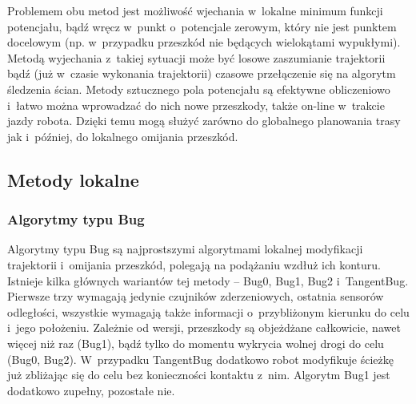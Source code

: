 Problemem obu metod jest możliwość
wjechania w~lokalne minimum funkcji potencjału, bądź wręcz w~punkt o~potencjale zerowym,
który nie jest punktem docelowym (np. w~przypadku przeszkód nie będących wielokątami
wypukłymi). Metodą wyjechania z~takiej sytuacji może być losowe zaszumianie trajektorii
bądź (już w~czasie wykonania trajektorii) czasowe przełączenie się na algorytm śledzenia
ścian. Metody sztucznego pola potencjału są efektywne obliczeniowo i~łatwo można wprowadzać
do nich nowe przeszkody, także on-line w~trakcie jazdy robota. Dzięki temu mogą służyć
zarówno do globalnego planowania trasy jak i~później, do lokalnego omijania przeszkód.

\subsection{Metody lokalne}

\subsubsection{Algorytmy typu Bug}

Algorytmy typu Bug są najprostszymi algorytmami lokalnej modyfikacji
trajektorii i~omijania przeszkód, polegają na podążaniu wzdłuż ich konturu.
Istnieje kilka głównych wariantów tej metody -- Bug0, Bug1, Bug2 i~TangentBug.
Pierwsze trzy wymagają jedynie czujników zderzeniowych, ostatnia sensorów odległości,
wszystkie wymagają także informacji o~przybliżonym kierunku do celu i~jego położeniu.
Zależnie od wersji, przeszkody są objeżdżane całkowicie, nawet więcej niż raz (Bug1),
bądź tylko do momentu wykrycia wolnej drogi do celu (Bug0, Bug2). W~przypadku TangentBug
dodatkowo robot modyfikuje ścieżkę już zbliżając się do celu bez konieczności kontaktu
z~nim. Algorytm Bug1 jest dodatkowo zupełny, pozostałe nie.

